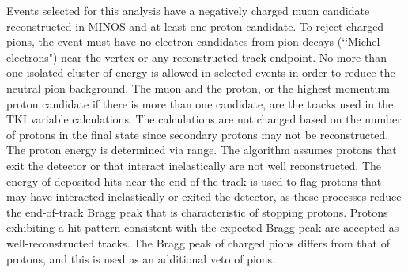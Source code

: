 \documentclass[aps,prd,twocolumn,showpacs,superscriptaddress,floatfix]{revtex4-2}  %
\newcounter{todocounter}
\newcommand{\JDK}[1]{\stepcounter{todocounter}
  {\color{blue!90} (Jeff: \thetodocounter: #1)}}
\begin{document}
Events selected for this analysis have a negatively charged muon candidate reconstructed in MINOS and at least one proton candidate.  
To reject charged pions, the event must have no  
electron candidates from pion decays (\lq\lq Michel electrons")
near the vertex or any reconstructed track endpoint.  No more than one isolated cluster of energy is allowed in selected events in order to reduce the neutral pion background.  The muon and the proton, or the highest momentum proton candidate if there is more than one candidate, are the tracks used in the TKI variable calculations.  The calculations are not changed based on the number of protons in the final state since secondary protons may not be reconstructed.
The proton energy is determined via range.  The algorithm assumes protons that exit the detector or that interact inelastically are not well reconstructed.  The energy of deposited hits near the end of the track is used to flag protons that may have interacted inelastically or exited the detector, as these processes reduce the  end-of-track Bragg peak that is characteristic of stopping protons. Protons exhibiting a hit pattern consistent with the expected Bragg peak are accepted as well-reconstructed tracks. The Bragg peak of charged pions differs from that of protons, and this is used as an additional veto of pions.

\end{document}
